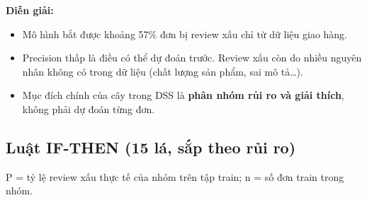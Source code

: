 \documentclass[12pt,a4paper]{report}
\renewcommand{\_}{\oldunderscore\allowbreak}
\begin{document}
\textbf{Diễn giải:}
\begin{itemize}
\item Mô hình bắt được khoảng 57\% đơn bị review xấu chỉ từ dữ liệu giao hàng.
\item Precision thấp là điều có thể dự đoán trước. Review xấu còn do nhiều nguyên nhân không có trong dữ liệu (chất lượng sản phẩm, sai mô tả\ldots).
\item Mục đích chính của cây trong DSS là \textbf{phân nhóm rủi ro và giải thích}, không phải dự đoán từng đơn.
\end{itemize}

\subsection{Luật IF-THEN (15 lá, sắp theo rủi ro)}

P = tỷ lệ review xấu thực tế của nhóm trên tập train; n = số đơn train trong nhóm.
\end{document}
